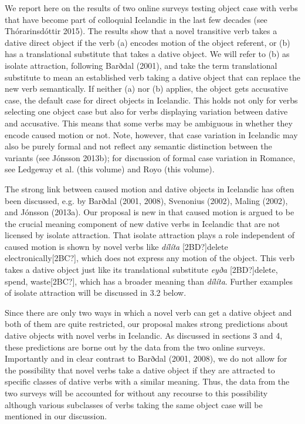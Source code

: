 \documentclass[12pt]{article}
\newenvironment{styleStandard}{\setlength\leftskip{0cm}\setlength\rightskip{0cm plus 1fil}\setlength\parindent{0cm}\setlength\parfillskip{0pt plus 1fil}\setlength\parskip{0in plus 1pt}\writerlistparindent\writerlistleftskip\leavevmode\normalfont\normalsize\writerlistlabel\ignorespaces}{\unskip\vspace{0.111in plus 0.0111in}\par}
\newcommand\writerlistleftskip{}
\newcommand\writerlistparindent{}
\newcommand\writerlistlabel{}
\begin{document}
\begin{styleStandard}
We report here on the results of two online surveys testing object case with verbs that have become part of colloquial Icelandic in the last few decades (see Thórarinsdóttir 2015). The results show that a novel transitive verb takes a dative direct object if the verb (a) encodes motion of the object referent, or (b) has a translational substitute that takes a dative object. We will refer to (b) as isolate attraction, following Barðdal (2001), and take the term translational substitute to mean an established verb taking a dative object that can replace the new verb semantically. If neither (a) nor (b) applies, the object gets accusative case, the default case for direct objects in Icelandic. This holds not only for verbs selecting one object case but also for verbs displaying variation between dative and accusative. This means that some verbs may be ambiguous in whether they encode caused motion or not. Note, however, that case variation in Icelandic may also be purely formal and not reflect any semantic distinction between the variants (see Jónsson 2013b); for discussion of formal case variation in Romance, see Ledgeway et al. (this volume) and Royo (this volume).
\end{styleStandard}

\begin{styleStandard}
The strong link between caused motion and dative objects in Icelandic has often been discussed, e.g. by Barðdal (2001, 2008), Svenonius (2002), Maling (2002), and Jónsson (2013a). Our proposal is new in that caused motion is argued to be the crucial meaning component of new dative verbs in Icelandic that are not licensed by isolate attraction. That isolate attraction plays a role independent of caused motion is shown by novel verbs like \textit{dílíta} [2BD?]delete electronically[2BC?], which does not express any motion of the object. This verb takes a dative object just like its translational substitute \textit{eyða} [2BD?]delete, spend, waste[2BC?], which has a broader meaning than \textit{dílíta}. Further examples of isolate attraction will be discussed in 3.2 below.
\end{styleStandard}

\begin{styleStandard}
Since there are only two ways in which a novel verb can get a dative object and both of them are quite restricted, our proposal makes strong predictions about dative objects with novel verbs in Icelandic. As discussed in sections 3 and 4, these predictions are borne out by the data from the two online surveys. Importantly and in clear contrast to Barðdal (2001, 2008), we do not allow for the possibility that novel verbs take a dative object if they are attracted to specific classes of dative verbs with a similar meaning. Thus, the data from the two surveys will be accounted for without any recourse to this possibility although various subclasses of verbs taking the same object case will be mentioned in our discussion.
\end{styleStandard}
\end{document}
